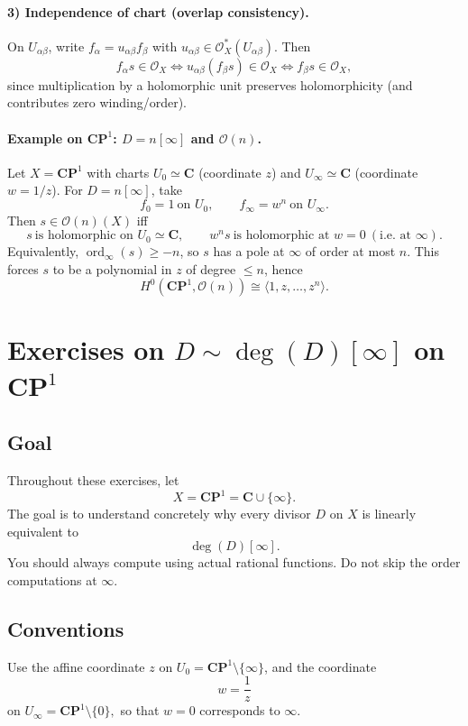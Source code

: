 \documentclass[11pt,openany]{article}
\newcommand{\ord}{\operatorname{ord}}
\begin{document}
\paragraph{3) Independence of chart (overlap consistency).}
On $U_{\alpha\beta}$, write $f_\alpha=u_{\alpha\beta}f_\beta$ with $u_{\alpha\beta}\in\mathcal O_X^*(U_{\alpha\beta})$.
Then
\[
f_\alpha s\in\mathcal O_X
\iff
u_{\alpha\beta}(f_\beta s)\in\mathcal O_X
\iff
f_\beta s\in\mathcal O_X,
\]
since multiplication by a holomorphic unit preserves holomorphicity (and contributes zero winding/order).

\paragraph{Example on $\mathbf{CP}^1$: $D=n[\infty]$ and $\mathcal O(n)$.}
Let $X=\mathbf{CP}^1$ with charts $U_0\simeq \mathbf C$ (coordinate $z$) and $U_\infty\simeq \mathbf C$ (coordinate $w=1/z$).
For $D=n[\infty]$, take
\[
f_0=1\ \text{on }U_0,\qquad f_\infty=w^n\ \text{on }U_\infty.
\]
Then $s\in \mathcal O(n)(X)$ iff
\[
s \ \text{is holomorphic on }U_0\simeq\mathbf C,
\qquad
w^n s \ \text{is holomorphic at }w=0 \ (\text{i.e. at }\infty).
\]
Equivalently, $\ord_\infty(s)\ge -n$, so $s$ has a pole at $\infty$ of order at most $n$.
This forces $s$ to be a polynomial in $z$ of degree $\le n$, hence
\[
H^0(\mathbf{CP}^1,\mathcal O(n))\cong \langle 1,z,\dots,z^n\rangle.
\]

\newpage
\section*{Exercises on \texorpdfstring{$D\sim \deg(D)[\infty]$}{D~deg(D)[infinity]} on \texorpdfstring{$\mathbf{CP}^1$}{CP1}}

\subsection*{Goal}
Throughout these exercises, let
\[
X=\mathbf{CP}^1=\mathbf{C}\cup\{\infty\}.
\]
The goal is to understand concretely why every divisor \(D\) on \(X\) is linearly equivalent to
\[
\deg(D)[\infty].
\]
You should always compute using actual rational functions. Do not skip the order computations at \(\infty\).

\subsection*{Conventions}
Use the affine coordinate \(z\) on \(U_0=\mathbf{CP}^1\setminus\{\infty\}\), and the coordinate
\[
w=\frac{1}{z}
\]
on \(U_\infty=\mathbf{CP}^1\setminus\{0\},
\)
so that \(w=0\) corresponds to \(\infty\).
\end{document}
